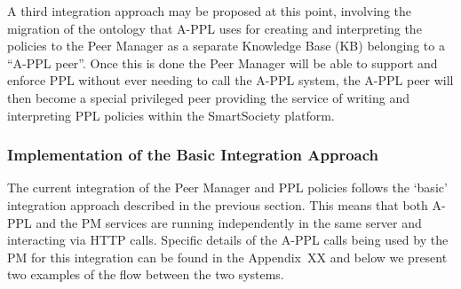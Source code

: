A third integration approach may be proposed at this point, involving the migration of the ontology that A-PPL uses for creating and interpreting the policies to the Peer Manager as a separate Knowledge Base (KB) belonging to a ``A-PPL peer''. Once this is done the Peer Manager will be able to support and enforce PPL without ever needing to call the A-PPL system, the A-PPL peer will then become a special privileged peer providing the service of writing and interpreting PPL policies within the SmartSociety platform. 

\subsubsection{Implementation of the Basic Integration Approach}
The current integration of the Peer Manager and PPL policies follows the `basic' integration approach described in the previous section. This means that both A-PPL and the PM services are running independently in the same server and interacting via HTTP calls. 
 Specific details of the A-PPL calls being used by the PM for this integration can be found in the Appendix~XX and below we present two examples of the flow between the two systems.
